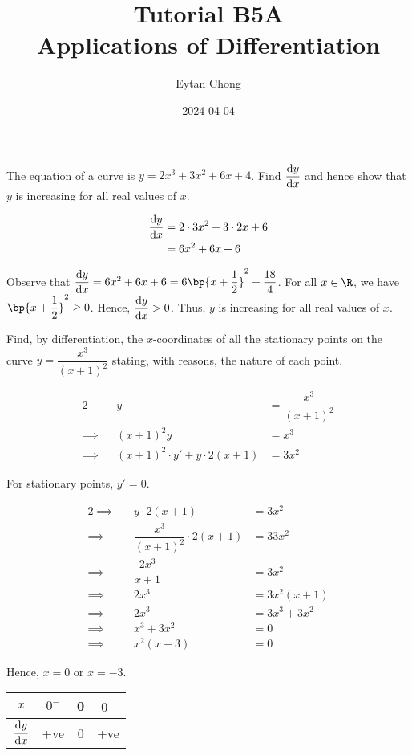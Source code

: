 \documentclass{echw}
\title{Tutorial B5A\\Applications of Differentiation}
\author{Eytan Chong}
\date{2024-04-04}
\begin{document}
    \problem{}
        The equation of a curve is $y=2x^3+3x^2+6x+4$. Find $\dfrac{\mathrm{d} y}{\mathrm{d} x}$ and hence show that $y$ is increasing for all real values of $x$.

    \solution
        \begin{align*}
            \dfrac{\mathrm{d} y}{\mathrm{d} x} &= 2\cdot3x^2 + 3 \cdot2x + 6\\
            &= 6x^2+6x+6
        \end{align*}


        Observe that $\der{y}{x} = 6x^2 + 6x+6 = 6\bp{x + \dfrac12}^2 + \dfrac{18}4$. For all $x \in \R$, we have $\bp{x + \dfrac12}^2 \geq 0$. Hence, $\dfrac{\mathrm{d} y}{\mathrm{d} x} > 0$. Thus, $y$ is increasing for all real values of $x$.

    \problem{}
        Find, by differentiation, the $x$-coordinates of all the stationary points on the curve $y = \dfrac{x^3}{(x+1)^2}$ stating, with reasons, the nature of each point.

    \solution
        \begin{alignat*}{2}
            &&y &= \dfrac{x^3}{(x+1)^2}\\
            \implies&&(x+1)^2y&=x^3\\
            \implies&&(x+1)^2\cdot y' + y\cdot2(x+1) &= 3x^2
        \end{alignat*}

        For stationary points, $y' = 0$.

        \begin{alignat*}{2}
            \implies&&y\cdot2(x+1) &= 3x^2\\
            \implies&&\dfrac{x^3}{(x+1)^2}\cdot2(x+1) &=3 3x^2\\
            \implies&&\dfrac{2x^3}{x+1} &= 3x^2\\
            \implies&&2x^3 &= 3x^2(x+1)\\
            \implies&&2x^3 &= 3x^3 + 3x^2\\
            \implies&&x^3+3x^2&=0\\
            \implies&&x^2(x+3)&=0
        \end{alignat*}

        Hence, $x = 0$ or $x = -3$.


        \begin{table}[h]
            \centering
            \begin{tabular}{|c|c|c|c|}
            \hline
            $x$          & $0^-$ & 0 & $0^+$ \\\hline
            $\dfrac{\mathrm{d} y}{\mathrm{d} x}$ & +ve   & 0 & +ve   \\[1ex]\hline
            \end{tabular}
        \end{table}
\end{document}
